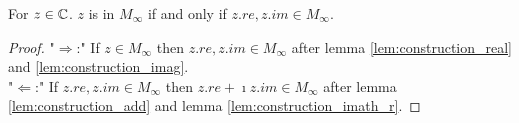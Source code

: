 \begin{corollary}
    \label{cor:z_iff_re_im_M_inf}
    \leanok
    For $z \in \mathbb{C}$. $z$ is in $M_{\infty}$ if and only if $z.re, z.im \in M_{\infty}$.
\end{corollary}
\begin{proof}
    \leanok
    "$\Rightarrow$:" If $z \in M_{\infty}$ then $z.re, z.im \in M_{\infty}$ after lemma \ref{lem:construction_real} and \ref{lem:construction_imag}.\\
    "$\Leftarrow$:" If $z.re, z.im \in M_{\infty}$ then $z.re + \imath z.im \in M_{\infty}$ after lemma \ref{lem:construction_add} and lemma \ref{lem:construction_imath_r}.
\end{proof}


